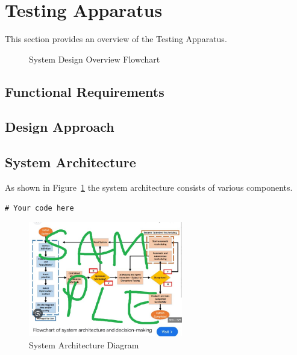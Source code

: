 \section{Testing Apparatus}
This section provides an overview of the Testing Apparatus.

\begin{figure}[H]
    \centering
    \scalebox{0.8}{ %
        
    }
    \caption{System Design Overview Flowchart}
    \label{fig:decriptiveLabel11} %
\end{figure}

\subsection{Functional Requirements}

\subsection{Design Approach}

\subsection{System Architecture}
As shown in Figure~\ref{fig:decriptiveLabel11} the system architecture consists of various components.

\begin{lstlisting}[style=cstyle, caption=System Architecture Code Example, label=lst:SystemArchitecture7]
# Your code here
\end{lstlisting}

\begin{figure}[htbp] %
    \centering
    \includegraphics[width=0.6\textwidth]{figures/methodology/system_architecture.jpg}
    \caption{System Architecture Diagram}
    \label{fig:system-architecture2}
\end{figure}


